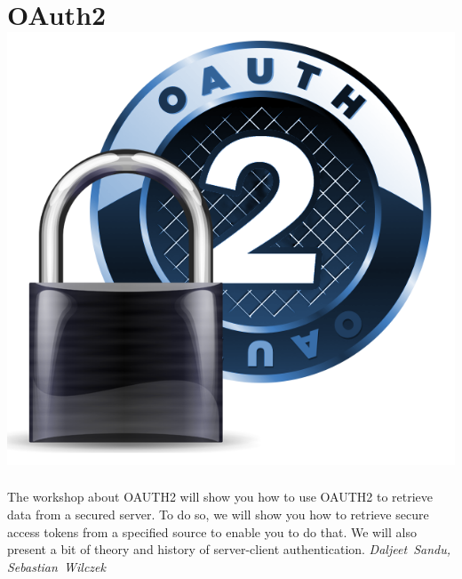 \section*{OAuth2\hfill\includegraphics[width=.35\linewidth]{images/LogoOAUTH2.png}}
The workshop about OAUTH2 will show you how to use OAUTH2 to retrieve data from a secured server.
To do so, we will show you how to retrieve secure access tokens from a specified source to enable you to do that.
We will also present a bit of theory and history of server-client authentication.
\hfill\textit{Daljeet~Sandu, Sebastian~Wilczek}
